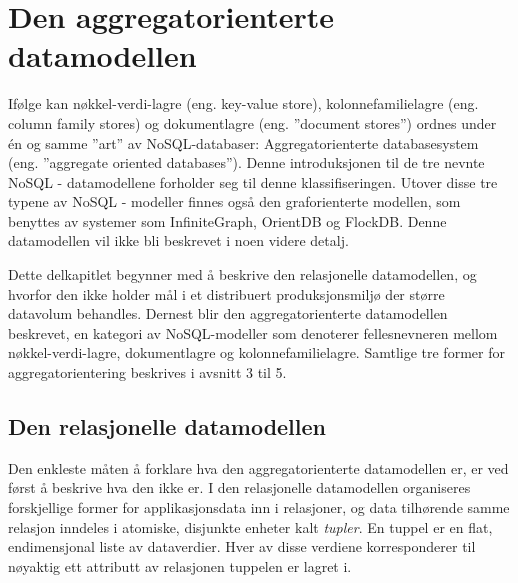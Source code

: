 \section{Den aggregatorienterte datamodellen}

Ifølge \cite{sadalage2013} kan nøkkel-verdi-lagre (eng. key-value store), kolonnefamilielagre (eng. column family stores) og dokumentlagre (eng. ''document stores'') ordnes under én og samme ''art'' av NoSQL-databaser: Aggregatorienterte databasesystem (eng. ''aggregate oriented databases''). Denne introduksjonen til de tre nevnte NoSQL - datamodellene forholder seg til denne klassifiseringen. Utover disse tre typene av NoSQL - modeller finnes også den graforienterte modellen, som benyttes av systemer som InfiniteGraph, OrientDB og FlockDB. Denne datamodellen vil ikke bli beskrevet i noen videre detalj.

Dette delkapitlet begynner med å beskrive den relasjonelle datamodellen, og hvorfor den ikke holder mål i et distribuert produksjonsmiljø der større datavolum behandles. Dernest blir den aggregatorienterte datamodellen beskrevet, en kategori av NoSQL-modeller som denoterer fellesnevneren mellom nøkkel-verdi-lagre, dokumentlagre og kolonnefamilielagre. Samtlige tre former for aggregatorientering beskrives i avsnitt 3 til 5.


\subsection{Den relasjonelle datamodellen}

Den enkleste måten å forklare hva den aggregatorienterte datamodellen er, er ved først å beskrive hva den ikke er. I den relasjonelle datamodellen organiseres forskjellige former for applikasjonsdata inn i relasjoner, og data tilhørende samme relasjon inndeles i atomiske, disjunkte enheter kalt \emph{tupler}. En tuppel er en flat, endimensjonal liste av dataverdier. Hver av disse verdiene korresponderer til nøyaktig ett attributt av relasjonen tuppelen er lagret i.

